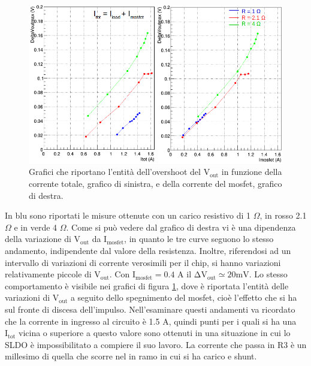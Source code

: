 \begin{figure}
\centering
\includegraphics[scale=.44]{Immagini/VoutOver}
\caption{Grafici che riportano l'entità dell'overshoot del $\mathrm{V_{out}}$ in funzione della corrente totale, grafico di sinistra, e della corrente del mosfet, grafico di destra.}
\label{VoutOver}
\end{figure}
In blu sono riportati le misure ottenute con un carico resistivo di 1 $\Omega$, in rosso 2.1 $\Omega$ e in verde 4 $\Omega$. 
Come si può vedere dal grafico di destra  vi è una dipendenza della variazione di $\mathrm{V_{out}}$ da $\mathrm{I_{mosfet}}$, in quanto le tre curve seguono lo stesso andamento, indipendente dal valore della resistenza.
Inoltre, riferendosi ad un intervallo di variazioni di corrente verosimili per il chip, si hanno variazioni relativamente piccole di $\mathrm{V_{out}}$. Con $\mathrm{I_{mosfet}= 0.4 }$ A il $\mathrm{\Delta V_{out} \simeq 20mV}$.
Lo stesso comportamento è visibile nei grafici di figura \ref{VoutOver}, dove è riportata l'entità delle variazioni di $\mathrm{V_{out}}$ a seguito dello spegnimento del mosfet, cioè l'effetto che si ha sul fronte di discesa dell'impulso. 
Nell'esaminare questi andamenti va ricordato che la corrente in ingresso al circuito è 1.5 A, quindi punti per i quali si ha una $\mathrm{I_{tot}}$ vicina o superiore a questo valore sono ottenuti in una situazione in cui lo SLDO è impossibilitato a compiere il suo lavoro. 
La corrente che passa in R3 è un millesimo di quella che scorre nel in ramo in cui si ha carico e shunt.

